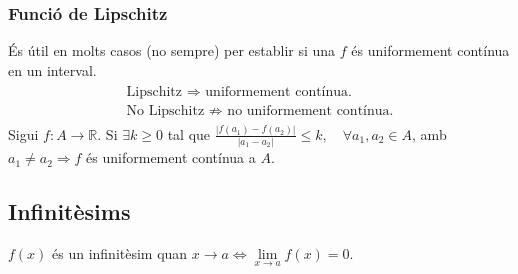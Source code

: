 \subsubsection*{Funció de Lipschitz}
És útil en molts casos (no sempre) per establir si una $f$ és uniformement contínua en un interval.
\begin{align*}
\begin{gathered}
    \text{Lipschitz } \Rightarrow \text{ uniformement contínua.} \\
    \text{No Lipschitz } \not \Rightarrow \text{ no uniformement contínua.}
\end{gathered}
\end{align*}
Sigui $f: A \rightarrow \mathbb{R}$. Si $\exists k \geq 0$ tal que $\displaystyle \frac{| f(a_{1}) - f(a_{2})|}{|a_{1} - a_{2}|} \leq k, \quad \forall a_{1}, a_{2} \in A$, amb $a_{1} \neq a_{2} \Rightarrow f$ és uniformement contínua a $A$.

\subsection{Infinitèsims}
$f(x)$ és un infinitèsim quan $x \to a \Leftrightarrow \lim\limits_{x \to a} f(x) = 0$.

